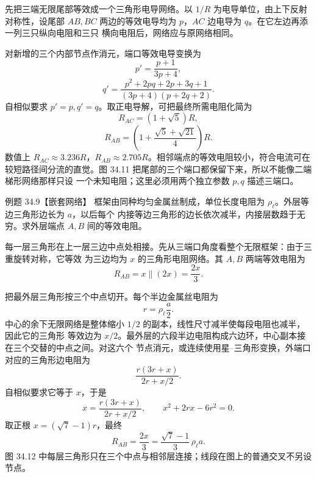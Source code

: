 \begin{xesolution}
先把三端无限尾部等效成一个三角形电导网络。以 $1/R$ 为电导单位，由上下反射对称性，设尾部
$AB,BC$ 两边的等效电导均为 $p$，$AC$ 边电导为 $q$。在它左边再添一列三只纵向电阻和三只
横向电阻后，网络应与原网络相同。

对新增的三个内部节点作消元，端口等效电导变换为
\begin{equation}
  p'=\frac{p+1}{3p+4},
\end{equation}
\begin{equation}
  q'=\frac{p^2+2pq+2p+3q+1}{(3p+4)(p+2q+2)}.
\end{equation}
自相似要求 $p'=p, q'=q$。取正电导解，可把最终所需电阻化简为
\begin{equation}
  \boxed{R_{AC}=(1+\sqrt5)R},
\end{equation}
\begin{equation}
  \boxed{R_{AB}=\left(1+\frac{\sqrt5+\sqrt{21}}4\right)R}.
\end{equation}
数值上 $R_{AC}\approx3.236R$，$R_{AB}\approx2.705R$。相邻端点的等效电阻较小，符合电流可在
较短路径间分流的直觉。图 34.11 把尾部的三个端口都保留下来，所以不能像二端梯形网络那样只设
一个未知电阻；这里必须用两个独立参数 $p,q$ 描述三端口。

\threeRailDiagram
\end{xesolution}

\Needspace{0.42\textheight}
\begin{origexamplebox}{例题 34.9【嵌套网络】}
框架由同种均匀金属丝制成，单位长度电阻为 $\rho_\ell$。外层等边三角形边长为 $a$，以后每个
内接等边三角形的边长依次减半，内接层数趋于无穷。求外层端点 $A,B$ 间的等效电阻。
\end{origexamplebox}

\begin{xesolution}
每一层三角形在上一层三边中点处相接。先从三端口角度看整个无限框架：由于三重旋转对称，它等效
为三边均为 $x$ 的三角形电阻网络。其 $A,B$ 两端等效电阻为
\begin{equation}
  R_{AB}=x\parallel(2x)=\frac{2x}{3}.
\end{equation}

把最外层三角形按三个中点切开。每个半边金属丝电阻为
\[
  r=\rho_\ell\frac a2.
\]
中心的余下无限网络是整体缩小 $1/2$ 的副本，线性尺寸减半使每段电阻也减半，因此它的三角形
等效边为 $x/2$。最外层的六段半边电阻构成六边环，中心副本接在三个交替的中点之间。对这六个
节点消元，或连续使用星--三角形变换，外端口对应的三角形边电阻为
\begin{equation}
  \frac{r(3r+x)}{2r+x/2}.
\end{equation}
自相似要求它等于 $x$，于是
\[
  x=\frac{r(3r+x)}{2r+x/2},
  \qquad
  x^2+2rx-6r^2=0.
\]
取正根 $x=(\sqrt7-1)r$，最终
\begin{equation}
  \boxed{R_{AB}=\frac{2x}{3}
  =\frac{\sqrt7-1}{3}\,\rho_\ell a}.
\end{equation}
图 34.12 中每层三角形只在三个中点与相邻层连接；线段在图上的普通交叉不另设节点。

\nestedTriangleDiagram
\end{xesolution}

